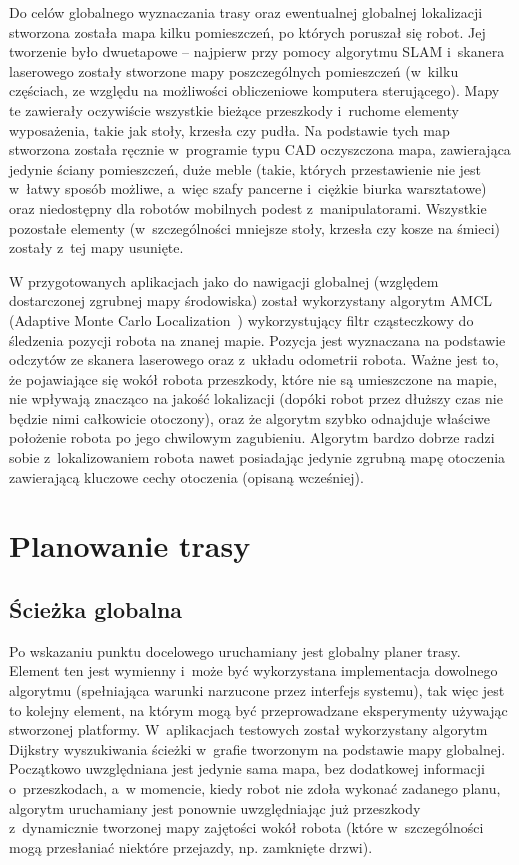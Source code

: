 Do celów globalnego wyznaczania trasy oraz ewentualnej globalnej lokalizacji stworzona
została mapa kilku pomieszczeń, po których poruszał się robot. Jej tworzenie było
dwuetapowe -- najpierw przy pomocy algorytmu SLAM i~skanera laserowego zostały
stworzone mapy poszczególnych pomieszczeń (w~kilku częściach, ze względu na możliwości
obliczeniowe komputera sterującego). Mapy te zawierały oczywiście wszystkie bieżące
przeszkody i~ruchome elementy wyposażenia, takie jak stoły, krzesła czy pudła.
Na podstawie tych map stworzona została ręcznie w~programie typu CAD oczyszczona
mapa, zawierająca jedynie ściany pomieszczeń, duże meble (takie, których przestawienie
nie jest w~łatwy sposób możliwe, a~więc szafy pancerne i~ciężkie biurka warsztatowe)
oraz niedostępny dla robotów mobilnych podest z~manipulatorami. Wszystkie pozostałe
elementy (w~szczególności mniejsze stoły, krzesła czy kosze na śmieci) zostały z~tej
mapy usunięte.

W przygotowanych aplikacjach jako do nawigacji globalnej (względem dostarczonej
zgrubnej mapy środowiska) został wykorzystany algorytm AMCL (Adaptive Monte Carlo
Localization~\cite{fox2001kld}) wykorzystujący filtr cząsteczkowy do śledzenia
pozycji robota na znanej mapie. Pozycja jest wyznaczana na podstawie odczytów
ze skanera laserowego oraz z~układu odometrii robota. Ważne jest to, że pojawiające
się wokół robota przeszkody, które nie są umieszczone na mapie, nie wpływają znacząco
na jakość lokalizacji (dopóki robot przez dłuższy czas nie będzie nimi całkowicie
otoczony), oraz że algorytm szybko odnajduje właściwe położenie robota po jego
chwilowym zagubieniu. Algorytm bardzo dobrze radzi sobie z~lokalizowaniem robota nawet
posiadając jedynie zgrubną mapę otoczenia zawierającą kluczowe cechy otoczenia
(opisaną wcześniej).

\section{Planowanie trasy}

\subsection{Ścieżka globalna}

Po wskazaniu punktu docelowego uruchamiany jest globalny planer trasy. Element ten
jest wymienny i~może być wykorzystana implementacja dowolnego algorytmu (spełniająca
warunki narzucone przez interfejs systemu), tak więc jest to kolejny element, na którym
mogą być przeprowadzane eksperymenty używając stworzonej platformy. W~aplikacjach
testowych został wykorzystany algorytm Dijkstry wyszukiwania ścieżki w~grafie tworzonym
na podstawie mapy globalnej. Początkowo uwzględniana jest jedynie sama mapa, bez
dodatkowej informacji o~przeszkodach, a~w momencie, kiedy robot nie zdoła wykonać
zadanego planu, algorytm uruchamiany jest ponownie uwzględniając już przeszkody
z~dynamicznie tworzonej mapy zajętości wokół robota (które w~szczególności mogą
przesłaniać niektóre przejazdy, np. zamknięte drzwi).

